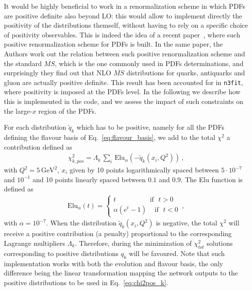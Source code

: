 %
It would be highly beneficial to work in a renormalization scheme in which PDFs are positive definite
also beyond LO: this would allow to implement directly the positivity of the distributions themself,
without having to rely on a specific choice of positivity observables.
This is indeed the idea of a recent paper~\cite{Candido:2020yat}, where such positive renormalization
scheme for PDFs is built. In the same paper, the Authors work out the relation between such positive
renormalization scheme and the standard $\overline{MS}$, which is the one commonly used in 
PDFs determinations, and surprisingly they find out that NLO $\overline{MS}$ distributions
for quarks, antiquarks and gluon are actually positive definite.  
This result has been accounted for in {\tt n3fit}, where positivity is imposed at the PDFs level.
In the following we describe how this is implemented in the code, and we assess the impact of such constraints
on the large-$x$ region of the PDFs.

%
For each distribution $\tilde{q}_k$ which has to be positive, namely for all the PDFs defining the
flavour basis of Eq.~\eqref{eq:flavour_basis}, we add to the total $\chi^2$ a contribution defined as  
\begin{align}
	\label{eq:chi2pos_k}
	\chi^2_{k,pos} = \Lambda_k \,\sum_i \,\text{Elu}_{\alpha}\left(-\tilde{q}_k\left(x_i,Q^2\right)\right)\,,
\end{align}
with $Q^2 = 5\, \text{GeV}^2$, $x_i$ given by 10 points logarithmically spaced between $5\cdot10^{-7}$ and $10^{-1}$ and 10 points
linearly spaced between $0.1$ and $0.9$. The Elu function is defined as 
\begin{align}
	\label{eq:Elu}
	\text{Elu}_{\alpha}\left(t\right) = 
	\begin{cases}
		t \,\,\,\,\,\,\,\,\,\,\,\,\,\,\,\,\,\,\,\,\,\,\,\,\,\,\,\,\,\,\text{if}\,\,\,\, t>0 \\
		\alpha\left(e^t-1\right)\,\,\,\,\,\,\,\text{if}\,\,\,\, t<0
	\end{cases}\,,
\end{align} 
with $\alpha=10^{-7}$. 
When the distribution $\tilde{q}_k\left(x_i, Q^2\right)$ is negative, the total $\chi^2$ will receive a positive contribution
(a penalty) proportional to the corresponding Lagrange multipliers $\Lambda_k$. 
Therefore, during the minimization of $\chi^2_{tot}$ solutions corresponding to positive distributions $q_k$
will be favoured. Note that such implementation works with both the evolution and flavour basis, the only 
difference being the linear transformation mapping the network outputs to the positive distributions to be 
used in Eq.~\eqref{eq:chi2pos_k}.

